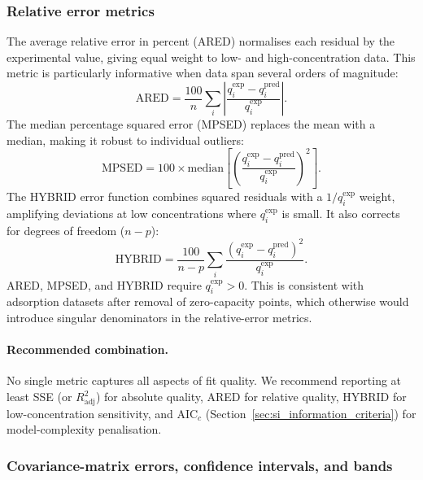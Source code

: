 \documentclass[journal=aamick,manuscript=article]{achemso}
\begin{document}
\subsubsection{Relative error metrics}

The average relative error in percent (ARED) normalises each residual
by the experimental value, giving equal weight to low- and
high-concentration data.  This metric is particularly informative when
data span several orders of magnitude:
\begin{equation}
	\text{ARED} = \frac{100}{n}\sum_{i}
	\left|\frac{q_i^{\exp} - q_i^{\mathrm{pred}}}{q_i^{\exp}}\right|.
	\label{eq:si_ARED}
\end{equation}
The median percentage squared error (MPSED) replaces the mean with a
median, making it robust to individual outliers:
\begin{equation}
	\text{MPSED} = 100 \times \mathrm{median}\!\left[
	\left(\frac{q_i^{\exp} - q_i^{\mathrm{pred}}}{q_i^{\exp}}\right)^{\!2}
	\right].
	\label{eq:si_MPSED}
\end{equation}
The HYBRID error function combines squared residuals with a $1/q_i^{\exp}$
weight, amplifying deviations at low concentrations where
$q_i^{\exp}$ is small.  It also corrects for degrees of freedom ($n - p$):
\begin{equation}
	\text{HYBRID} = \frac{100}{n-p}\sum_{i}
	\frac{(q_i^{\exp} - q_i^{\mathrm{pred}})^2}{q_i^{\exp}}.
	\label{eq:si_HYBRID}
\end{equation}
ARED, MPSED, and HYBRID require $q_i^{\exp} > 0$. This is consistent
with adsorption datasets after removal of zero-capacity points, which
otherwise would introduce singular denominators in the relative-error
metrics.

\paragraph{Recommended combination.}
No single metric captures all aspects of fit quality.  We recommend
reporting at least SSE (or $R^2_{\mathrm{adj}}$) for absolute quality,
ARED for relative quality, HYBRID for low-concentration sensitivity,
and AIC$_c$ (Section~\ref{sec:si_information_criteria}) for
model-complexity penalisation.

\subsubsection{Covariance-matrix errors, confidence intervals, and bands}
\end{document}

